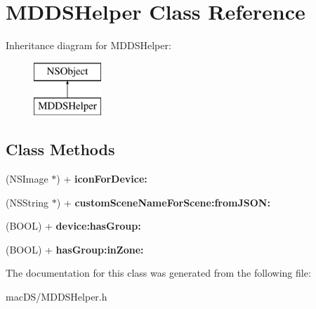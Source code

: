 \hypertarget{interface_m_d_d_s_helper}{\section{M\-D\-D\-S\-Helper Class Reference}
\label{interface_m_d_d_s_helper}
}
Inheritance diagram for M\-D\-D\-S\-Helper\-:\begin{figure}[H]
\begin{center}
\leavevmode
\includegraphics[height=2.000000cm]{interface_m_d_d_s_helper}
\end{center}
\end{figure}
\subsection*{Class Methods}
\begin{DoxyCompactItemize}
\item 
\hypertarget{interface_m_d_d_s_helper_a3f32213841f6409bca57bb0aa3d4d5c1}{(N\-S\-Image $\ast$) + {\bfseries icon\-For\-Device\-:}}\label{interface_m_d_d_s_helper_a3f32213841f6409bca57bb0aa3d4d5c1}

\item 
\hypertarget{interface_m_d_d_s_helper_ad7a3c10995dc96733a6ac86b30de6f2d}{(N\-S\-String $\ast$) + {\bfseries custom\-Scene\-Name\-For\-Scene\-:from\-J\-S\-O\-N\-:}}\label{interface_m_d_d_s_helper_ad7a3c10995dc96733a6ac86b30de6f2d}

\item 
\hypertarget{interface_m_d_d_s_helper_a81f16075bd0ff53c55472f89ed35f994}{(B\-O\-O\-L) + {\bfseries device\-:has\-Group\-:}}\label{interface_m_d_d_s_helper_a81f16075bd0ff53c55472f89ed35f994}

\item 
\hypertarget{interface_m_d_d_s_helper_aaea456daff4bdf1ce9f46850579d172e}{(B\-O\-O\-L) + {\bfseries has\-Group\-:in\-Zone\-:}}\label{interface_m_d_d_s_helper_aaea456daff4bdf1ce9f46850579d172e}

\end{DoxyCompactItemize}


The documentation for this class was generated from the following file\-:\begin{DoxyCompactItemize}
\item 
mac\-D\-S/M\-D\-D\-S\-Helper.\-h\end{DoxyCompactItemize}
